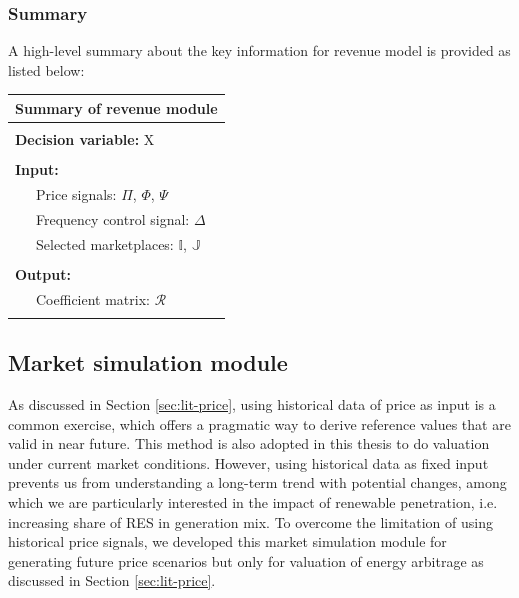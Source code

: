 \subsubsection{Summary}
A high-level summary about the key information for revenue model is provided as listed below:
\begin{table}[h!]
	\begin{tabular}{L{0.95\textwidth}}
		\hline
		\textbf{Summary of revenue module} \\
		\hline
		\\
		\textbf{Decision variable:}  X\\
		\\
		\textbf{Input:} \\
		~~~Price signals: $\Pi$, $\Phi$, $\Psi$ \\
		~~~Frequency control signal: $\Delta$\\
		~~~Selected marketplaces: $\mathbb{I}$, $\mathbb{J}$\\
		\\
		\textbf{Output:} \\
		~~~Coefficient matrix: $\mathcal{R}$ \\
		\\
		\hline
	\end{tabular}
\end{table}

\subsection{Market simulation module}
\label{sec:market-simulation}
As discussed in Section \ref{sec:lit-price}, using historical data of price as input is a common exercise, which offers a pragmatic way to derive reference values that are valid in near future. This method is also adopted in this thesis to do valuation under current market conditions. However, using historical data as fixed input prevents us from understanding a long-term trend with potential changes, among which we are particularly interested in the impact of renewable penetration, i.e. increasing share of RES in generation mix. To overcome the limitation of using historical price signals, we developed this market simulation module for generating future price scenarios but only for valuation of energy arbitrage as discussed in Section \ref{sec:lit-price}.

